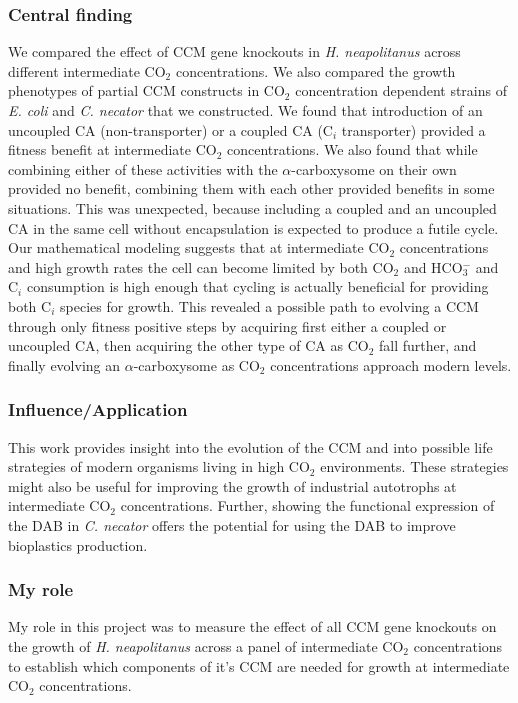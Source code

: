\documentclass{article}
\begin{document}
\subsubsection{Central finding}
We compared the effect of CCM gene knockouts in \textit{H. neapolitanus} across different intermediate CO$_2$ concentrations.
We also compared the growth phenotypes of partial CCM constructs in CO$_2$ concentration dependent strains of \textit{E. coli} and \textit{C. necator} that we constructed.
We found that introduction of an uncoupled CA (non-transporter) or a coupled CA (C$_i$ transporter) provided a fitness benefit at intermediate CO$_2$ concentrations.
We also found that while combining either of these activities with the $\alpha$-carboxysome on their own provided no benefit, combining them with each other provided benefits in some situations. 
This was unexpected, because including a coupled and an uncoupled CA in the same cell without encapsulation is expected to produce a futile cycle.
Our mathematical modeling suggests that at intermediate CO$_2$ concentrations and high growth rates the cell can become limited by both CO$_2$ and HCO$_{3}^{-}$ and C$_i$ consumption is high enough that cycling is actually beneficial for providing both C$_i$ species for growth.
This revealed a possible path to evolving a CCM through only fitness positive steps by acquiring first either a coupled or uncoupled CA, then acquiring the other type of CA as CO$_2$ fall further, and finally evolving an $\alpha$-carboxysome as CO$_2$ concentrations approach modern levels.
%
\subsubsection{Influence/Application}
This work provides insight into the evolution of the CCM and into possible life strategies of modern organisms living in high CO$_2$ environments.
These strategies might also be useful for improving the growth of industrial autotrophs at intermediate CO$_2$ concentrations.
Further, showing the functional expression of the DAB in \textit{C. necator} offers the potential for using the DAB to improve bioplastics production.
%
\subsubsection{My role}
My role in this project was to measure the effect of all CCM gene knockouts on the growth of \textit{H. neapolitanus} across a panel of intermediate CO$_2$ concentrations to establish which components of it's CCM are needed for growth at intermediate CO$_2$ concentrations.
%
\nocite{Flamholz2022-yo}
\printbibliography[heading=none]
\end{document}
